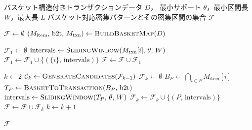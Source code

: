 \begin{algorithm}[t]
\caption{Basket-aware Apriori-Window}
\label{alg:basket_aware_apriori_window}
\begin{algorithmic}[1]
\Require バスケット構造付きトランザクションデータ $D$，
         最小サポート $\theta$，最小区間長 $W$，最大長 $L$
\Ensure  バスケット対応密集パターンとその密集区間の集合 $\mathcal{F}$

\State $\mathcal{F} \leftarrow \emptyset$
\State {}
\State $(M_{\text{item}},\, \text{b2t},\, M_{\text{txn}})
       \leftarrow \Call{BuildBasketMap}{D}$
\State {}
\State {}
\State {}

\State {}
\State $\mathcal{F}_1 \leftarrow \emptyset$
    \State $\text{intervals} \leftarrow
        \Call{SlidingWindow}{M_{\text{txn}}[i],\, \theta,\, W}$
        \State $\mathcal{F}_1 \leftarrow \mathcal{F}_1 \cup \{(\{i\},\, \text{intervals})\}$
    \EndIf
\EndFor
\State $\mathcal{F} \leftarrow \mathcal{F} \cup \mathcal{F}_1$

\State {}
\State $k \leftarrow 2$
    \State $\mathcal{C}_k \leftarrow
        \Call{GenerateCandidates}{\mathcal{F}_{k-1}}$
    \State {}
    \State $\mathcal{F}_k \leftarrow \emptyset$
        \State {}
        \State $B_P \leftarrow \bigcap_{i \in P} M_{\text{item}}[i]$
        \State {}
        \State $T_P \leftarrow \Call{BasketToTransaction}{B_P,\, \text{b2t}}$
        \State {}
        \State $\text{intervals} \leftarrow
            \Call{SlidingWindow}{T_P,\, \theta,\, W}$
            \State $\mathcal{F}_k \leftarrow
                \mathcal{F}_k \cup \{(P,\, \text{intervals})\}$
        \EndIf
    \EndFor
    \State $\mathcal{F} \leftarrow \mathcal{F} \cup \mathcal{F}_k$
    \State $k \leftarrow k + 1$
\EndWhile

\State \Return $\mathcal{F}$
\end{algorithmic}
\end{algorithm}
